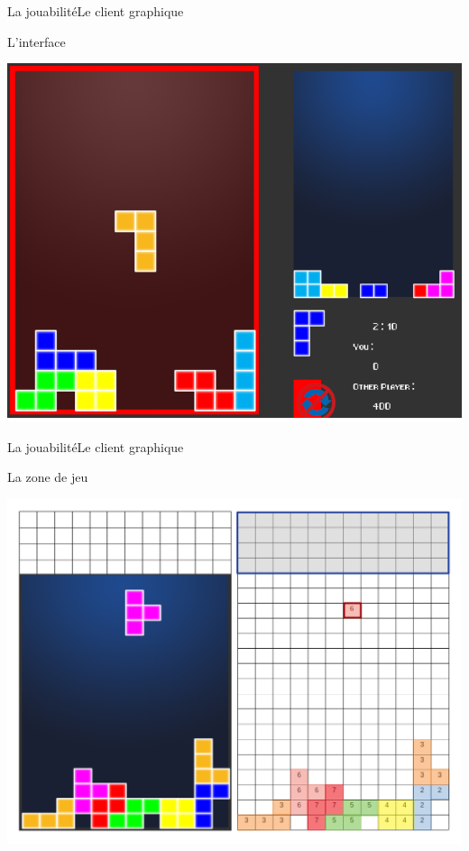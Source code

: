 \documentclass[french]{beamer}
\begin{document}
		\begin{frame}{La jouabilité}{Le client graphique}
			\begin{block}{L'interface}
				\begin{center}
					\includegraphics[scale=0.25]{img/bla.png}
				\end{center}
			\end{block}
		\end{frame}

		\begin{frame}{La jouabilité}{Le client graphique}
			\begin{block}{La zone de jeu}
				\begin{center}
					\includegraphics[scale=0.2]{img/grid.png}
				\end{center}
			\end{block}
		\end{frame}
\end{document}
